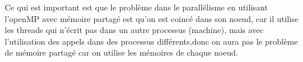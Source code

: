 \documentclass[12pt,titlepage]{article}
\begin{document}
Ce qui est important est que le problème dans le parallélisme en utilisant l'openMP avec mémoire partagé est qu'on est coincé dans son noeud, car il utilise les threads qui n'écrit pas dans un autre processus (machine), mais avec l'utilisation des appels dans des processus différents,donc on aura pas le problème de mémoire partagé car on utilise les mémoires de chaque noeud.








\pagebreak




\pagebreak 

\nocite{*} 



\end{document}
